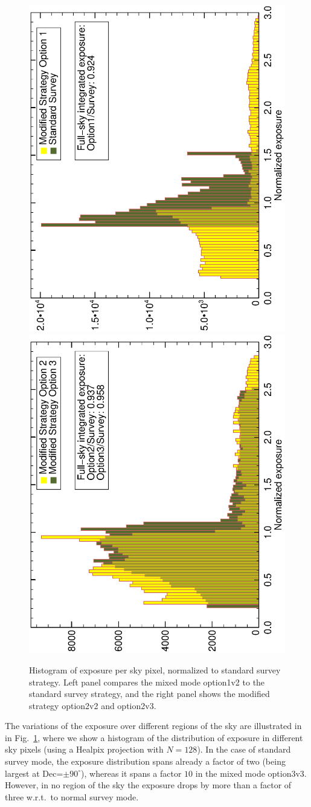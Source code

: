 \documentclass[aps,prd,superscriptaddress,nofootinbib,fixlfloat, 12pt]{revtex4-1}
\begin{document}
\begin{figure}[t]
  \begin{center}
    \includegraphics[width=0.39\linewidth, angle=-90]{plots/option1_survey_hist.ps}
    \includegraphics[width=0.39\linewidth, angle=-90]{plots/option2_option3_hist.ps}
    \vspace{-0.5cm}
  \end{center}
  \caption{Histogram of exposure per sky pixel, normalized to standard survey
    strategy. Left panel compares the
    mixed mode option1v2 to the standard survey strategy, and the right panel
    shows the modified strategy option2v2 and option2v3.}
  \label{fig:expHisto}
\end{figure}

The variations of the exposure over different regions of the sky are
illustrated in in Fig.~\ref{fig:expHisto}, where we show a histogram of the
distribution of exposure in different sky pixels (using a Healpix projection
with $N=128$). In the case of standard survey mode, the exposure distribution
spans already a factor of two (being largest at Dec=$\pm90^\circ$), whereas it
spans a factor $10$ in the mixed mode option3v3. However, in no region of the
sky the exposure drops by more than a factor of three w.r.t.~to normal survey
mode.
\end{document}
